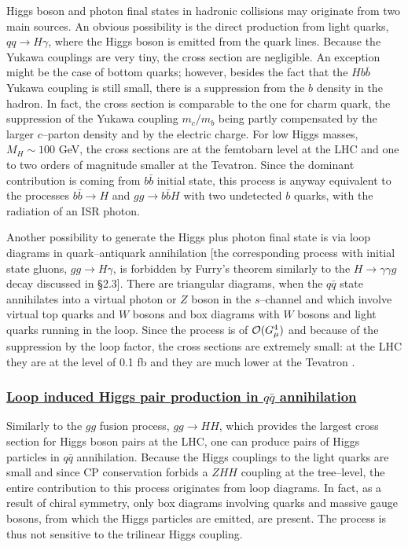 Higgs boson and photon final states in hadronic collisions \cite{pp-Hgamma} may
originate from two main sources. An obvious possibility is the  direct
production from light quarks, $ qq \to H \gamma$, where the Higgs boson is
emitted from the quark lines. Because the Yukawa couplings are very tiny, the
cross section are negligible. An exception might be the case of bottom quarks;
however, besides the fact that the $Hb\bar b$ Yukawa coupling is  still small,
there is a suppression from the $b$ density in the hadron. In fact, the cross
section is comparable to the one for charm quark, the  suppression of the
Yukawa coupling $m_c/m_b$ being partly compensated by the larger $c$--parton 
density and by the electric charge. For low Higgs masses, $M_H\sim 100$ GeV, 
the cross sections are at the femtobarn level at the LHC and one to two orders 
of magnitude smaller at the Tevatron. Since the dominant contribution is coming
from $b \bar{b}$ initial state, this process is anyway equivalent to the
processes $b\bar b \to H$ and $gg \to b\bar b H$ with two  undetected $b$
quarks, with the radiation of an ISR photon. \s

Another possibility to generate the Higgs plus photon final state is via loop
diagrams in quark--antiquark annihilation [the corresponding process with
initial state  gluons, $gg \to H \gamma$, is forbidden by Furry's theorem
similarly to the $H \to \gamma \gamma g$ decay discussed in \S2.3].  There
are triangular diagrams, when the $q\bar{q}$ state annihilates into a virtual
photon or $Z$ boson in the $s$--channel and which involve virtual top quarks
and $W$ bosons and box diagrams with $W$ bosons and light quarks running in the
loop. Since the process is of ${\cal O}(G_\mu^4)$ and because of the 
suppression by the loop factor, the cross sections are extremely small: at 
the LHC they are at the level of 0.1 fb and they are much lower at the 
Tevatron \cite{pp-Hgamma}. 

\subsubsection*{\underline{Loop induced Higgs pair production in $q\bar{q}$
annihilation}}

Similarly to the $gg$ fusion process, $gg \to HH$, which provides the largest
cross section for Higgs boson pairs at the LHC, one can produce pairs of Higgs
particles in $q\bar{q}$ annihilation. Because the Higgs couplings to the light
quarks are small and since CP conservation forbids a $ZHH$ coupling at the
tree--level, the entire contribution to this process originates from loop
diagrams. In fact, as a result of chiral symmetry, only box diagrams involving
quarks and massive gauge bosons, from which the Higgs particles are emitted, 
are present. The process is thus not sensitive to the trilinear Higgs coupling.
\s


